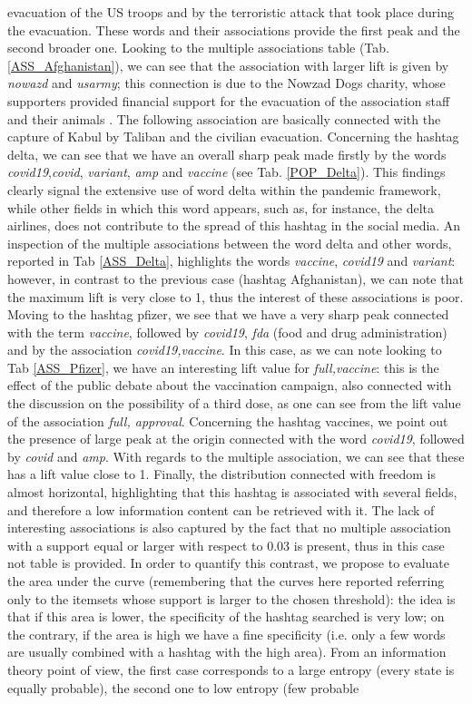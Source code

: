 \documentclass[12pt,%
               a4paper,%
               oneside,openany,%
               titlepage,%
               headinclude,footinclude,%
               BCOR5mm,%
               cleardoublepage=empty,%
               tablecaptionabove,%
               floatperchapter,
               ]{scrreprt}                 %
\begin{document}
evacuation of the US troops and by the terroristic attack that took place during the evacuation. These words and their associations provide the first peak and the second broader one. Looking to the multiple associations table (Tab. \ref{ASS_Afghanistan}), we can see that the association with larger lift is given by \textit{nowazd} and \textit{usarmy}; this connection is due to the Nowzad Dogs charity, whose supporters provided financial support for the evacuation of the association staff and their animals \cite{Nowzad}. The following association are basically connected with the capture of Kabul by Taliban and the civilian evacuation. Concerning the hashtag delta, we can see that we have an overall sharp peak made firstly by the words \textit{covid19},\textit{covid}, \textit{variant}, \textit{amp} and \textit{vaccine} (see Tab. \ref{POP_Delta}). This findings clearly signal the extensive use of word delta within the pandemic framework, while other fields in which this word appears, such as, for instance, the delta airlines, does not contribute to the spread of this hashtag in the social media. An inspection of the multiple associations between the word delta and other words, reported in Tab \ref{ASS_Delta}, highlights the words \textit{vaccine}, \textit{covid19} and \textit{variant}: however, in contrast to the previous case (hashtag Afghanistan), we can note that the maximum lift is very close to 1, thus the interest of these associations is poor. Moving to the hashtag pfizer, we see that we have a very sharp peak connected with the term \textit{vaccine}, followed by \textit{covid19}, \textit{fda} (food and drug administration) and by the association \textit{covid19,vaccine}. In this case, as we can note looking to Tab \ref{ASS_Pfizer}, we have an interesting lift value for \textit{full,vaccine}: this is the effect of the public debate about the vaccination campaign, also connected with the discussion on the possibility of a third dose, as one can see from the lift value of the association \textit{full, approval}. Concerning the hashtag vaccines, we point out the presence of large peak at the origin connected with the word \textit{covid19}, followed by \textit{covid} and \textit{amp}. With regards to the multiple association, we can see that these has a lift value close to 1. Finally, the distribution connected with freedom is almost horizontal, highlighting that this hashtag is associated with several fields, and therefore a low information content can be retrieved with it. The lack of interesting associations is also captured by the fact that no multiple association with a support equal or larger with respect to 0.03 is present, thus in this case not table is provided. In order to quantify this contrast, we propose to evaluate the area under the curve (remembering that the curves here reported referring only to the itemsets whose support is larger to the chosen threshold): the idea is that if this area is lower, the specificity of the hashtag searched is very low; on the contrary, if the area is high we have a fine specificity (i.e. only a few words are usually combined with a hashtag with the high area). From an information theory point of view, the first case corresponds to a large entropy (every state is equally probable), the second one to low entropy (few probable 
\end{document}
